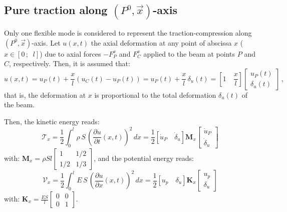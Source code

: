 \documentclass[smallcondensed]{svjour3}     %
\begin{document}
\subsection{Pure traction along $(P^0,\vec{x})$-axis}
Only one flexible mode is considered to represent the traction-compression along  $(P^0,\vec{x})$-axis. Let $u(x,t)$ the axial deformation at any point of abscissa  $x$ ($x\in [0\,;\;\; l]$) due to axial forces $-F^x_P$ and $F^x_C$ applied to the beam at points $P$ and $C$, respectively. Then, it is assumed that:
\[
u(x,t)= u_P(t)+\frac{x}{l}(u_C(t)-u_P(t))=u_P(t)+\frac{x}{l}\,\delta_u(t)=\left[1\quad \frac{x}{l}\right]\left[\begin{array}{c} u_P(t)\\ \delta_u(t)\end{array}\right]\,,
\]
that is, the deformation at $x$ is proportional to the total deformation $\delta_u(t)$ of the beam.

Then, the kinetic energy reads:
\[
\mathcal{T}_x=\frac{1}{2}\int_{0}^l\rho\,S\,\left(\frac{\partial u}{\partial t}(x,t)\right)^2 \,dx=\frac{1}{2}[\dot{u}_P \quad \dot{\delta}_u]\mathbf{M}_x\left[\begin{array}{c}\dot{u}_P \\ \dot{\delta}_u \end{array}\right]
\]
with: $\mathbf{M}_x=\rho S l\left[\begin{array}{cc}1 & 1/2 \\ 1/2 & 1/3 \end{array}\right]$,
and the potential energy reads:
\[
\mathcal{V}_x=\frac{1}{2}\int_{0}^lE\,S\,\left(\frac{\partial u}{\partial x}(x,t)\right)^2 \,dx=\frac{1}{2}[u_p \quad \delta_u]\mathbf{K}_x\left[\begin{array}{c}u_p \\ \delta_u \end{array}\right]
\]
with: $\mathbf{K}_x=\frac{E S}{l}\left[\begin{array}{cc}0 & 0 \\ 0 & 1 \end{array}\right]$.
\end{document}
